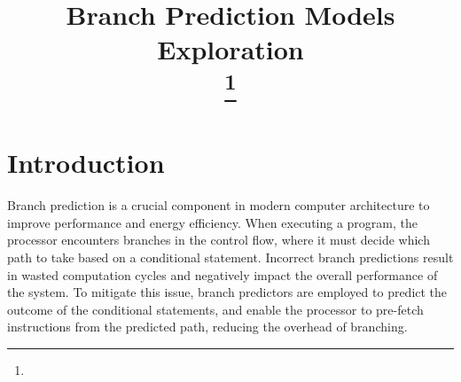 \documentclass[conference]{IEEEtran}
\begin{document}
\title{Branch Prediction Models Exploration\\
\thanks{}
}
\author{
\and
{}
\and
{}
\and
{}
\and
{}
}

\maketitle

\begin{abstract}
\end{abstract}

\section{Introduction}
Branch prediction is a crucial component in modern computer architecture to improve performance and energy efficiency. When executing a program, the processor encounters branches in the control flow, where it must decide which path to take based on a conditional statement. Incorrect branch predictions result in wasted computation cycles and negatively impact the overall performance of the system. To mitigate this issue, branch predictors are employed to predict the outcome of the conditional statements, and enable the processor to pre-fetch instructions from the predicted path, reducing the overhead of branching.
\end{document}

